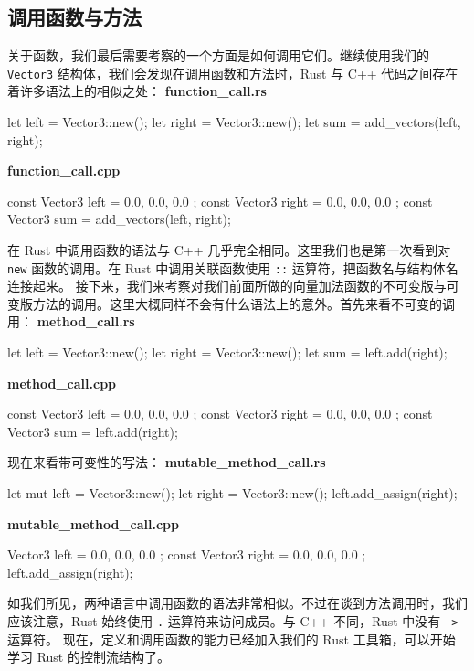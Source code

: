 \subsection{调用函数与方法}
\label{idx:idx_85c633ef}
\label{idx:idx_1f76d7ed}
关于函数，我们最后需要考察的一个方面是如何调用它们。继续使用我们的
\texttt{Vector3} 结构体，我们会发现在调用函数和方法时，Rust 与 C++
代码之间存在着许多语法上的相似之处：
\textbf{function\_\allowbreak{}call.\allowbreak{}rs}
\begin{codebox}[rust]
let left = Vector3::new();
let right = Vector3::new();
let sum = add_vectors(left, right);
\end{codebox}
\textbf{function\_\allowbreak{}call.\allowbreak{}cpp}
\begin{codebox}[rust]
const Vector3 left = { 0.0, 0.0, 0.0 };
const Vector3 right = { 0.0, 0.0, 0.0 };
const Vector3 sum = add_vectors(left, right);
\end{codebox}
在 Rust 中调用函数的语法与 C++ 几乎完全相同。这里我们也是第一次看到对 \texttt{new} 函数的调用。在 Rust 中调用关联函数使用 \texttt{::} 运算符，把函数名与结构体名连接起来。
\label{idx:idx_e7108865}
\label{idx:idx_80039eab}
接下来，我们来考察对我们前面所做的向量加法函数的不可变版与可变版方法的调用。这里大概同样不会有什么语法上的意外。首先来看不可变的调用：
\textbf{method\_\allowbreak{}call.\allowbreak{}rs}
\begin{codebox}[rust]
let left = Vector3::new();
let right = Vector3::new();
let sum = left.add(right);
\end{codebox}
\textbf{method\_\allowbreak{}call.\allowbreak{}cpp}
\begin{codebox}[rust]
const Vector3 left = { 0.0, 0.0, 0.0 };
const Vector3 right = { 0.0, 0.0, 0.0 };
const Vector3 sum = left.add(right);
\end{codebox}
现在来看带可变性的写法：
\textbf{mutable\_\allowbreak{}method\_\allowbreak{}call.\allowbreak{}rs}
\begin{codebox}[rust]
let mut left = Vector3::new();
let right = Vector3::new();
left.add_assign(right);
\end{codebox}
\textbf{mutable\_\allowbreak{}method\_\allowbreak{}call.\allowbreak{}cpp}
\begin{codebox}[rust]
Vector3 left = { 0.0, 0.0, 0.0 };
const Vector3 right = { 0.0, 0.0, 0.0 };
left.add_assign(right);
\end{codebox}
如我们所见，两种语言中调用函数的语法非常相似。不过在谈到方法调用时，我们应该注意，Rust 始终使用 \texttt{.} 运算符来访问成员。与 C++ 不同，Rust 中没有 \texttt{->} 运算符。
\label{idx:idx_5decb213}
\label{idx:idx_c46cfe2b}
现在，定义和调用函数的能力已经加入我们的 Rust 工具箱，可以开始学习 Rust 的控制流结构了。
